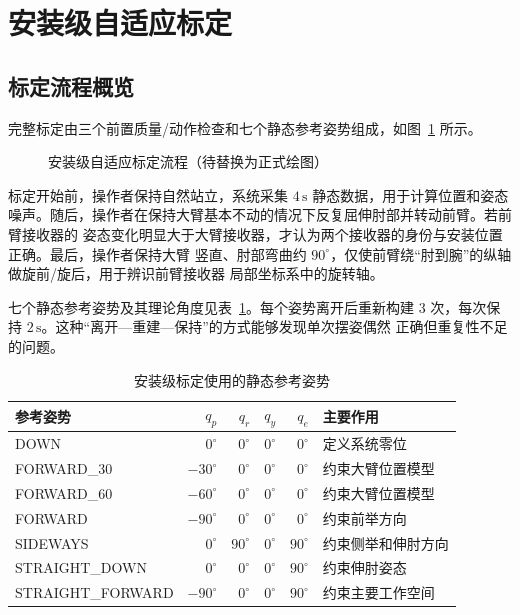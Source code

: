 \section{安装级自适应标定}
\label{sec:ch4_installation_calibration}

\subsection{标定流程概览}
\label{subsec:ch4_calibration_overview}

完整标定由三个前置质量/动作检查和七个静态参考姿势组成，如图~\ref{fig:ch4_calibration_flow}
所示。
\begin{figure}[htbp]
  \centering
  \caption{安装级自适应标定流程（待替换为正式绘图）}
  \label{fig:ch4_calibration_flow}
\end{figure}

标定开始前，操作者保持自然站立，系统采集 $4\,\mathrm{s}$ 静态数据，用于计算位置和姿态
噪声。随后，操作者在保持大臂基本不动的情况下反复屈伸肘部并转动前臂。若前臂接收器的
姿态变化明显大于大臂接收器，才认为两个接收器的身份与安装位置正确。最后，操作者保持大臂
竖直、肘部弯曲约 $90^\circ$，仅使前臂绕“肘到腕”的纵轴做旋前/旋后，用于辨识前臂接收器
局部坐标系中的旋转轴。

七个静态参考姿势及其理论角度见表~\ref{tab:ch4_reference_poses}。每个姿势离开后重新构建
3 次，每次保持 $2\,\mathrm{s}$。这种“离开---重建---保持”的方式能够发现单次摆姿偶然
正确但重复性不足的问题。

\begin{table}[htbp]
  \centering
  \caption{安装级标定使用的静态参考姿势}
  \label{tab:ch4_reference_poses}
  \begin{tabularx}{\linewidth}{@{}XrrrrX@{}}
    \toprule
    参考姿势 & $q_p$ & $q_r$ & $q_y$ & $q_e$ & 主要作用 \\
    \midrule
    DOWN             & $0^\circ$   & $0^\circ$  & $0^\circ$ & $0^\circ$  & 定义系统零位 \\
    FORWARD\_30      & $-30^\circ$ & $0^\circ$  & $0^\circ$ & $0^\circ$  & 约束大臂位置模型 \\
    FORWARD\_60      & $-60^\circ$ & $0^\circ$  & $0^\circ$ & $0^\circ$  & 约束大臂位置模型 \\
    FORWARD          & $-90^\circ$ & $0^\circ$  & $0^\circ$ & $0^\circ$  & 约束前举方向 \\
    SIDEWAYS         & $0^\circ$   & $90^\circ$ & $0^\circ$ & $90^\circ$ & 约束侧举和伸肘方向 \\
    STRAIGHT\_DOWN   & $0^\circ$   & $0^\circ$  & $0^\circ$ & $90^\circ$ & 约束伸肘姿态 \\
    STRAIGHT\_FORWARD& $-90^\circ$ & $0^\circ$  & $0^\circ$ & $90^\circ$ & 约束主要工作空间 \\
    \bottomrule
  \end{tabularx}
\end{table}

